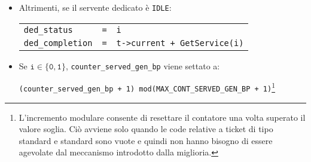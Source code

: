 \begin{enumerate}[label=Step \arabic*), align=left, leftmargin=*]
\begin{itemize}
\begin{itemize}
\begin{center}
\begin{tabular}{l l l}
\end{tabular}
\end{center}
\item Altrimenti, se il servente dedicato è \texttt{IDLE}:
\begin{center}
\begin{tabular}{l l l}
\texttt{ded\_status} & \texttt{=} & \texttt{i} \\
\texttt{ded\_completion} & \texttt{=} & \texttt{t->current + GetService(i)}
\end{tabular}
\end{center}
\item {\color{purple}Se $\mathtt{i \in \lbrace 0, 1 \rbrace}$, \texttt{counter\_served\_gen\_bp} viene settato a:
\begin{center}
\texttt{(counter\_served\_gen\_bp + 1) mod(MAX\_CONT\_SERVED\_GEN\_BP + 1)}\footnote{\label{note:miglioria-modello-computazionale-1}L'incremento modulare consente di resettare il contatore una volta superato il valore soglia. Ciò avviene solo quando le code relative a ticket di tipo \uo{} standard e \pp{} standard sono vuote e quindi non hanno bisogno di essere agevolate dal meccanismo introdotto dalla miglioria.}
\end{center}}
\end{itemize}


\end{itemize}
\end{enumerate}
